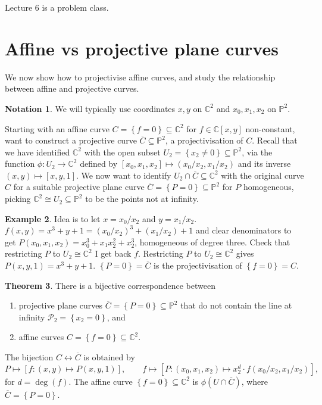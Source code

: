 \documentclass{article}
\newcommand{\C}{\mathbb{C}}
\renewcommand{\P}{\mathbb{P}}
\newcommand{\rb}[1]{\left( #1 \right)}
\renewcommand{\sb}[1]{\left[ #1 \right]}
\newcommand{\cb}[1]{\left\{ #1 \right\}}
\theoremstyle{definition}\newtheorem{definition}{Definition}[section]
\theoremstyle{definition}\newtheorem{notation}[definition]{Notation}
\theoremstyle{definition}\newtheorem{remark}[definition]{Remark}
\theoremstyle{definition}\newtheorem{example}[definition]{Example}
\theoremstyle{definition}\newtheorem{fact}{Fact}
\theoremstyle{definition}\newtheorem{exercise}{Exercise}
\newtheorem{theorem}[definition]{Theorem}
\begin{document}

Lecture 6 is a problem class.

\section{Affine vs projective plane curves}

We now show how to projectivise affine curves, and study the relationship between affine and projective curves.

\begin{notation}
We will typically use coordinates $ x, y $ on $ \C^2 $ and $ x_0, x_1, x_2 $ on $ \P^2 $.
\end{notation}

Starting with an affine curve $ C = \cb{f = 0} \subseteq \C^2 $ for $ f \in \C\sb{x, y} $ non-constant, want to construct a projective curve $ \overline{C} \subseteq \P^2 $, a projectivisation of $ C $. Recall that we have identified $ \C^2 $ with the open subset $ U_2 = \cb{x_2 \ne 0} \subseteq \P^2 $, via the function $ \phi : U_2 \to \C^2 $ defined by $ \sb{x_0, x_1, x_2} \mapsto \rb{x_0 / x_2, x_1 / x_2} $ and its inverse $ \rb{x, y} \mapsto \sb{x, y, 1} $. We now want to identify $ U_2 \cap \overline{C} \subseteq \C^2 $ with the original curve $ C $ for a suitable projective plane curve $ \overline{C} = \cb{P = 0} \subseteq \P^2 $ for $ P $ homogeneous, picking $ \C^2 \cong U_2 \subseteq \P^2 $ to be the points not at infinity.

\begin{example}
Idea is to let $ x = x_0 / x_2 $ and $ y = x_1 / x_2 $. $ f\rb{x, y} = x^3 + y + 1 = \rb{x_0 / x_2}^3 + \rb{x_1 / x_2} + 1 $ and clear denominators to get $ P\rb{x_0, x_1, x_2} = x_0^3 + x_1x_2^2 + x_2^3 $, homogeneous of degree three. Check that restricting $ P $ to $ U_2 \cong \C^2 $ I get back $ f $. Restricting $ P $ to $ U_2 \cong \C^2 $ gives $ P\rb{x, y, 1} = x^3 + y + 1 $. $ \cb{P = 0} = \overline{C} $ is the projectivisation of $ \cb{f = 0} = C $.
\end{example}

\begin{theorem}
\label{thm:5.2}
There is a bijective correspondence between
\begin{enumerate}
\item projective plane curves $ \overline{C} = \cb{P = 0} \subseteq \P^2 $ that do not contain the line at infinity $ \mathcal{P}_2 = \cb{x_2 = 0} $, and
\item affine curves $ C = \cb{f = 0} \subseteq \C^2 $.
\end{enumerate}
The bijection $ C \leftrightarrow \overline{C} $ is obtained by
$$ P \mapsto \sb{f : \rb{x, y} \mapsto P\rb{x, y, 1}}, \qquad f \mapsto \sb{P : \rb{x_0, x_1, x_2} \mapsto x_2^d \cdot f\rb{x_0 / x_2, x_1 / x_2}}, $$
for $ d = \deg\rb{f} $. The affine curve $ \cb{f = 0} \subseteq \C^2 $ is $ \phi\rb{U \cap \overline{C}} $, where $ \overline{C} = \cb{P = 0} $.
\end{theorem}
\end{document}
